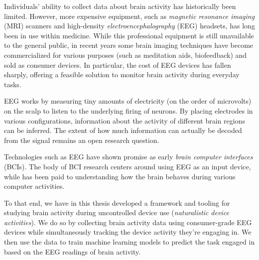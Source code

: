 Individuals' ability to collect data about brain activity has historically been limited. However, more expensive equipment, such as \emph{magnetic resonance imaging} (MRI) scanners and high-density \emph{electroencephalography} (EEG) headsets, has long been in use within medicine. While this professional equipment is still unavailable to the general public, in recent years some brain imaging techniques have become commercialized for various purposes (such as meditation aids, biofeedback) and sold as consumer devices. In particular, the cost of EEG devices has fallen sharply, offering a feasible solution to monitor brain activity during everyday tasks.

EEG works by measuring tiny amounts of electricity (on the order of microvolts) on the scalp to listen to the underlying firing of neurons. By placing electrodes in various configurations, information about the activity of different brain regions can be inferred. The extent of how much information can actually be decoded from the signal remains an open research question.


Technologies such as EEG have shown promise as early \emph{brain computer interfaces} (BCIs). The body of BCI research centers around using EEG as an input device, while  has been paid to understanding how the brain behaves during various computer activities.




To that end, we have in this thesis developed a framework and tooling for studying brain activity during uncontrolled device use (\emph{naturalistic device activities}). We do so by collecting brain activity data using consumer-grade EEG devices while simultaneously tracking the device activity they're engaging in. We then use the data to train machine learning models to predict the task engaged in based on the EEG readings of brain activity.

